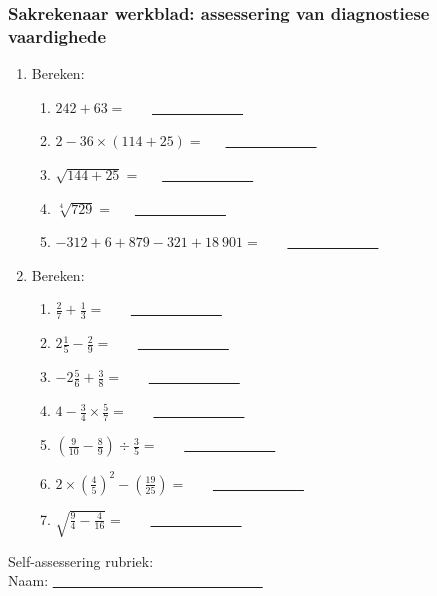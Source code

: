\subsubsection{Sakrekenaar werkblad: assessering van diagnostiese vaardighede}
\begin{enumerate}[itemsep=7pt, label=\textbf{\arabic*}. ] 
 \item Bereken:
\begin{enumerate}[itemsep=6pt,label=\textbf{(\alph*)}]
\item $ 242 + 63=$   ~~~\underline{~~~~~~~~~~~~~}
\item $2-36 \times (114 + 25)=$~~~\underline{~~~~~~~~~~~~~}
\item $\sqrt{144+25}=$~~~\underline{~~~~~~~~~~~~~}
\item $\sqrt[4]{729}=$~~~\underline{~~~~~~~~~~~~~}
\item $-312 + 6 + 879 -321 + 18~ 901=$ ~~~\underline{~~~~~~~~~~~~~}
\end{enumerate}

\item Bereken:
\begin{enumerate}[itemsep=6pt,label=\textbf{(\alph*)}]
\item $\frac{2}{7} + \frac{1}{3}=$  ~~~\underline{~~~~~~~~~~~~~}
\item $2\frac{1}{5} - \frac{2}{9}=$ ~~~\underline{~~~~~~~~~~~~~}
\item $-2\frac{5}{6} + \frac{3}{8}=$ ~~~\underline{~~~~~~~~~~~~~}
\item $ 4 - \frac{3}{4} \times \frac{5}{7}=$ ~~~\underline{~~~~~~~~~~~~~}
\item $\left(\frac{9}{10} - \frac{8}{9}\right) \div \frac{3}{5}=$ ~~~\underline{~~~~~~~~~~~~~}
\item $2\times \left(\frac{4}{5}\right)^2 - \left(\frac{19}{25}\right)=$ ~~~\underline{~~~~~~~~~~~~~}
\item $\sqrt{\frac{9}{4} - \frac{4}{16}} =$ ~~~\underline{~~~~~~~~~~~~~}
\end{enumerate}
\end{enumerate}
\clearpage
Self-assessering rubriek: \\
Naam: \underline{~~~~~~~~~~~~~~~~~~~~~~~~~~~~~~}
